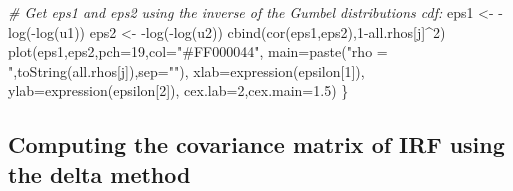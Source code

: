 \documentclass[
]{book}
\newenvironment{Shaded}{\begin{snugshade}}{\end{snugshade}}
\newcommand{\AttributeTok}[1]{\textcolor[rgb]{0.77,0.63,0.00}{#1}}
\newcommand{\CommentTok}[1]{\textcolor[rgb]{0.56,0.35,0.01}{\textit{#1}}}
\newcommand{\DecValTok}[1]{\textcolor[rgb]{0.00,0.00,0.81}{#1}}
\newcommand{\FloatTok}[1]{\textcolor[rgb]{0.00,0.00,0.81}{#1}}
\newcommand{\FunctionTok}[1]{\textcolor[rgb]{0.00,0.00,0.00}{#1}}
\newcommand{\NormalTok}[1]{#1}
\newcommand{\OtherTok}[1]{\textcolor[rgb]{0.56,0.35,0.01}{#1}}
\newcommand{\SpecialCharTok}[1]{\textcolor[rgb]{0.00,0.00,0.00}{#1}}
\newcommand{\StringTok}[1]{\textcolor[rgb]{0.31,0.60,0.02}{#1}}
\theoremstyle{definition}
\theoremstyle{definition}
\theoremstyle{definition}
\theoremstyle{definition}
\theoremstyle{remark}
\begin{document}
\begin{Shaded}
\begin{Highlighting}[]
  \CommentTok{\# Get eps1 and eps2 using the inverse of the Gumbel distribution\textquotesingle{}s cdf:}
\NormalTok{  eps1 }\OtherTok{\textless{}{-}} \SpecialCharTok{{-}}\FunctionTok{log}\NormalTok{(}\SpecialCharTok{{-}}\FunctionTok{log}\NormalTok{(u1))}
\NormalTok{  eps2 }\OtherTok{\textless{}{-}} \SpecialCharTok{{-}}\FunctionTok{log}\NormalTok{(}\SpecialCharTok{{-}}\FunctionTok{log}\NormalTok{(u2))}
  \FunctionTok{cbind}\NormalTok{(}\FunctionTok{cor}\NormalTok{(eps1,eps2),}\DecValTok{1}\SpecialCharTok{{-}}\NormalTok{all.rhos[j]}\SpecialCharTok{\^{}}\DecValTok{2}\NormalTok{)}
  \FunctionTok{plot}\NormalTok{(eps1,eps2,}\AttributeTok{pch=}\DecValTok{19}\NormalTok{,}\AttributeTok{col=}\StringTok{"\#FF000044"}\NormalTok{,}
       \AttributeTok{main=}\FunctionTok{paste}\NormalTok{(}\StringTok{"rho = "}\NormalTok{,}\FunctionTok{toString}\NormalTok{(all.rhos[j]),}\AttributeTok{sep=}\StringTok{""}\NormalTok{),}
       \AttributeTok{xlab=}\FunctionTok{expression}\NormalTok{(epsilon[}\DecValTok{1}\NormalTok{]),}
       \AttributeTok{ylab=}\FunctionTok{expression}\NormalTok{(epsilon[}\DecValTok{2}\NormalTok{]),}
       \AttributeTok{cex.lab=}\DecValTok{2}\NormalTok{,}\AttributeTok{cex.main=}\FloatTok{1.5}\NormalTok{)}
\NormalTok{\}}
\end{Highlighting}
\end{Shaded}

\hypertarget{IRFDELTA}{%
\subsection{Computing the covariance matrix of IRF using the delta method}\label{IRFDELTA}}
\end{document}
